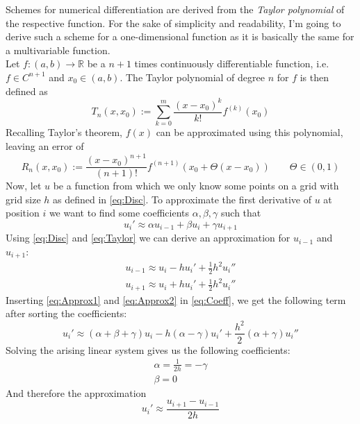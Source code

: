 Schemes for numerical differentiation are derived from the \textit{Taylor polynomial} of the
respective function. For the sake of simplicity and readability, I'm going to derive such a scheme for a
one-dimensional function as it is basically the same for a multivariable function. \\
Let $f: (a, b) \rightarrow \mathbb{R}$ be a $n+1$ times continuously differentiable function, i.e.
$f \in C^{n+1}$ and $x_0 \in (a, b)$. The Taylor polynomial of degree $n$ for $f$ is then defined as
\begin{equation}\label{eq:Taylor}
    T_n(x, x_0) := \sum\limits_{k = 0}^{m} \frac{(x-x_0)^k}{k!}f^{(k)}(x_0)
\end{equation}
Recalling Taylor's theorem, $f(x)$ can be approximated using this polynomial, leaving an error of
\begin{equation}
    R_n(x, x_0) := \frac{(x-x_0)^{n+1}}{(n+1)!}f^{(n+1)}(x_0 + \Theta(x-x_0))\qquad \Theta \in(0,1)
\end{equation}
Now, let $u$ be a function from which we only know some points on a grid with grid size $h$ as 
defined in \ref{eq:Disc}. To approximate the first derivative of $u$ at position $i$ we want to
find some coefficients $\alpha, \beta, \gamma$ such that
\begin{equation}\label{eq:Coeff}
    u_i' \approx \alpha u_{i-1} + \beta u_i + \gamma u_{i+1}
\end{equation}
Using \ref{eq:Disc} and \ref{eq:Taylor} we can derive an approximation for $u_{i-1}$ and $u_{i+1}$:
\begin{gather}
    u_{i-1} \approx u_i - hu_i' + \frac{1}{2}h^2u_i''\label{eq:Approx1}\\
    u_{i+1} \approx u_i + hu_i' + \frac{1}{2}h^2u_i''\label{eq:Approx2}
\end{gather}
Inserting \ref{eq:Approx1} and \ref{eq:Approx2} in \ref{eq:Coeff}, we get the following term after sorting the
coefficients:
\begin{equation}
    u_i' \approx (\alpha + \beta + \gamma) u_i -h (\alpha - \gamma)u_i' + \frac{h^2}{2}(\alpha +
    \gamma)u_i''
\end{equation}
Solving the arising linear system gives us the following coefficients:
\begin{gather}
    \alpha = \frac{1}{2h} = -\gamma\\
    \beta = 0
\end{gather}
And therefore the approximation
\begin{equation}
    u_i' \approx \frac{u_{i+1} - u_{i-1}}{2h}
\end{equation}
